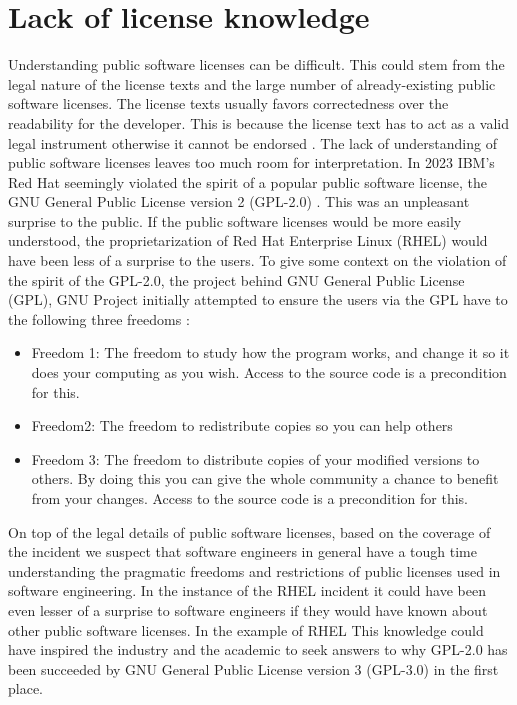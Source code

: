 \section{Lack of license knowledge}
Understanding public software licenses can be difficult. This could stem from the legal nature of the license texts and the large number of already-existing public software licenses. The license texts usually favors correctedness over the readability for the developer. This is because the license text has to act as a valid legal instrument otherwise it cannot be endorsed \citep{ferguson2006gpl}. The lack of understanding of public software licenses leaves too much room for interpretation. In 2023 IBM's Red Hat seemingly violated the spirit of a popular public software license, the GNU General Public License version 2 (GPL-2.0) \citep{ibm:rhel, sfc:rhel}. This was an unpleasant surprise to the public. If the public software licenses would be more easily understood, the proprietarization of Red Hat Enterprise Linux (RHEL) would have been less of a surprise to the users. To give some context on the violation of the spirit of the GPL-2.0, the project behind GNU General Public License (GPL), GNU Project initially attempted to ensure the users via the GPL have to the following three freedoms \citep{gnu:free}:
\begin{itemize}
	\item Freedom 1:	The freedom to study how the program works, and change it so it does your computing as you wish. Access to the source code is a precondition for this.
	\item Freedom2: The freedom to redistribute copies so you can help others
	\item Freedom 3:	The freedom to distribute copies of your modified versions to others. By doing this you can give the whole community a chance to benefit from your changes. Access to the source code is a precondition for this.
\end{itemize}

On top of the legal details of public software licenses, based on the coverage of the incident we suspect that software engineers in general have a tough time understanding the pragmatic freedoms and restrictions of public licenses used in software engineering. In the instance of the RHEL incident it could have been even lesser of a surprise to software engineers if they would have known about other public software licenses. In the example of RHEL This knowledge could have inspired the industry and the academic to seek answers to why GPL-2.0 has been succeeded by GNU General Public License version 3 (GPL-3.0) in the first place.

